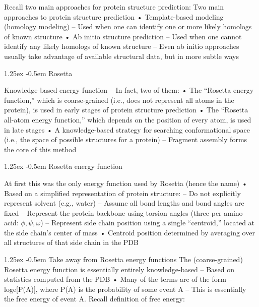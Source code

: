 \documentclass[8pt]{article}
\makeatletter
\newlength{\norm}
\newlength{\nrm}
\renewcommand{\paragraph}{%
  \@startsection{paragraph}{4}%
  {\z@}{1.25ex \@plus 2pt \@minus 2pt}{-0.5em}%
  {\fontsize{\f@size}{\nrm}\normalfont\bfseries}%
}
\makeatother
\begin{document}
Recall two main approaches for protein structure prediction:
Two main approaches to protein
structure prediction
• Template-based modeling (homology modeling)
– Used when one can identify one or more likely
homologs of known structure
• Ab initio structure prediction
– Used when one cannot identify any likely homologs of
known structure
– Even ab initio approaches usually take advantage of
available structural data, but in more subtle ways

\paragraph{Rosetta} 

Knowledge-based energy function
– In fact, two of them:
• The “Rosetta energy function,” which is coarse-grained
(i.e., does not represent all atoms in the protein), is used
in early stages of protein structure prediction
• The “Rosetta all-atom energy function,” which depends
on the position of every atom, is used in late stages
• A knowledge-based strategy for searching
conformational space (i.e., the space of possible
structures for a protein)
– Fragment assembly forms the core of this method

\paragraph{Rosetta energy function}

At first this was the only energy function used by
Rosetta (hence the name)
• Based on a simplified representation of protein
structure:
– Do not explicitly represent solvent (e.g., water)
– Assume all bond lengths and bond angles are fixed
– Represent the protein backbone using torsion angles
(three per amino acid: $\phi, \psi, \omega$)
– Represent side chain position using a single “centroid,”
located at the side chain’s center of mass
• Centroid position determined by averaging over all
structures of that side chain in the PDB

\paragraph{Take away from Rosetta energy functions} 
The (coarse-grained) Rosetta energy function is
essentially entirely knowledge-based
– Based on statistics computed from the PDB
• Many of the terms are of the form –loge[P(A)],
where P(A) is the probability of some event A
– This is essentially the free energy of event A. Recall
definition of free energy:
\end{document}
